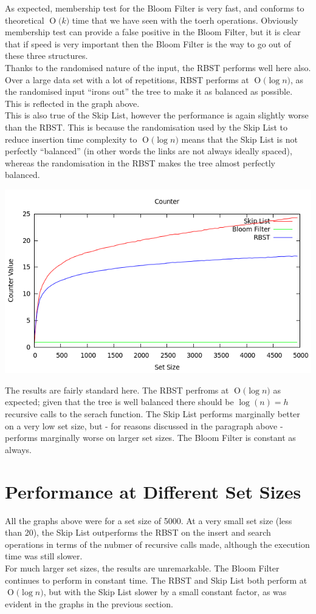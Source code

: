 \documentclass[11pt, notitlepage]{report}
\newcommand{\BigO}[1]{\ensuremath{\operatorname{O}\bigl(#1\bigr)}}
\begin{document}
As expected, membership test for the Bloom Filter is very fast, and conforms to theoretical \BigO{k} time that we have seen with the toerh operations. Obviously membership test can provide a false positive in the Bloom Filter, but it is clear that if speed is very important then the Bloom Filter is the way to go out of these three structures.\\

Thanks to the randomised nature of the input, the RBST performs well here also. Over a large data set with a lot of repetitions, RBST performs at \BigO{\log n}, as the randomised input ``irons out'' the tree to make it as balanced as possible. This is reflected in the graph above.\\

This is also true of the Skip List, however the performance is again slightly worse than the RBST. This is because the randomisation used by the Skip List to reduce insertion time complexity to \BigO{\log n} means that the Skip List is not perfectly ``balanced'' (in other words the links are not always ideally spaced), whereas the randomisation in the RBST makes the tree almost perfectly balanced.

\includegraphics[width=\linewidth]{img/Counter-Find}

The results are fairly standard here. The RBST perfroms at \BigO{\log n} as expected; given that the tree is well balanced there should be $\log(n) = h$ recursive calls to the serach function. The Skip List performs marginally better on a very low set size, but - for reasons discussed in the paragraph above - performs marginally worse on larger set sizes. The Bloom Filter is constant as always. 


\section*{Performance at Different Set Sizes}

All the graphs above were for a set size of 5000. At a very small set size (less than 20), the Skip List outperforms the RBST on the insert and search operations in terms of the nubmer of recursive calls made, although the execution time was still slower.\\

For much larger set sizes, the results are unremarkable. The Bloom Filter continues to perform in constant time. The RBST and Skip List both perform at \BigO{\log n}, but with the Skip List slower by a small constant factor, as was evident in the graphs in the previous section.
\end{document}
